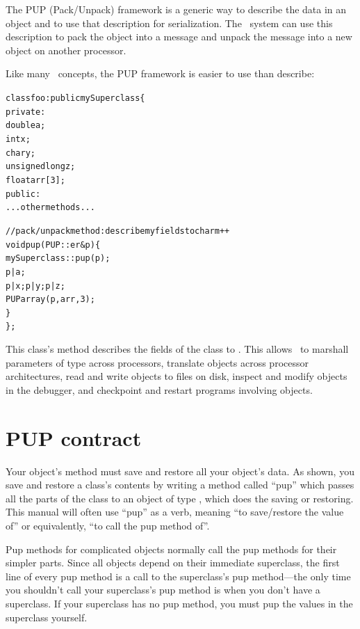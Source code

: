 \label{sec:pup}

The  PUP (Pack/Unpack) framework is a generic way to describe the
data in an object and to use that description for serialization.
The \charmpp\ system can use this description to pack the object
into a message and unpack the message into a new object on another
processor.

Like many \CC\ concepts, the PUP framework is easier to use than 
describe: 

\begin{alltt}
class foo : public mySuperclass \{
 private:
    double a;
    int x;
    char y;
    unsigned long z;
    float arr[3];
 public:
    ...other methods...

    //pack/unpack method: describe my fields to charm++
    void pup(PUP::er &p) \{
      mySuperclass::pup(p);
      p|a;
      p|x; p|y; p|z;
      PUParray(p,arr,3);
    \}
\};
\end{alltt}

This class's  method describes the fields of the class to \charmpp{}.
This allows \charmpp\ to marshall parameters of type  across processors,
translate  objects across processor architectures, read and write
 objects to files on disk, inspect and modify  objects in the
debugger, and checkpoint and restart programs involving  objects.



\section{PUP contract}

\label{sec:pupcontract}
Your object's  method must save and restore all your object's
data.  As shown, you save and restore a class's contents by writing a
method called ``pup'' which passes all the parts of the class to an
object of type  , which does the saving or
restoring.  This manual will often use ``pup'' as a verb, meaning ``to
save/restore the value of'' or equivalently, ``to call the pup method
of''.

Pup methods for complicated objects normally call the pup methods
for their simpler parts.  Since all objects depend on their immediate
superclass, the first line of every pup method is a call to the 
superclass's pup method---the only time you shouldn't call your superclass's
pup method is when you don't have a superclass.  If your superclass has
no pup method, you must pup the values in the superclass yourself.


